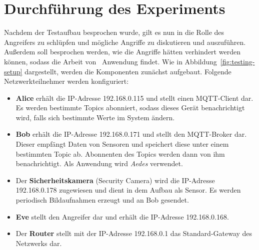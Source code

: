 \section{Durchführung des Experiments}
Nachdem der Testaufbau besprochen wurde, gilt es nun in die Rolle des Angreifers
zu schlüpfen und mögliche Angriffe zu diskutieren und auszuführen. Außerdem soll
besprochen werden, wie die Angriffe hätten verhindert werden können, sodass die
Arbeit von~\cite{paper} Anwendung findet. Wie in
Abbildung~\ref{fig:testing-setup} dargestellt, werden die Komponenten zunächst
aufgebaut. Folgende Netzwerkteilnehmer werden konfiguriert:

\begin{itemize}
  \item \textbf{Alice} erhält die IP-Adresse 192.168.0.115 und stellt einen
    MQTT-Client dar. Es werden bestimmte Topics abonniert, sodass dieses Gerät
    benachrichtigt wird, falls sich bestimmte Werte im System ändern.
  \item \textbf{Bob} erhält die IP-Adresse 192.168.0.171 und stellt den
    MQTT-Broker dar. Dieser empfängt Daten von Sensoren und speichert diese
    unter einem bestimmten Topic ab. Abonnenten des Topics werden dann von ihm
    benachrichtigt. Als Anwendung wird \textit{Aedes} verwendet.
  \item Der \textbf{Sicherheitskamera} (Security Camera) wird die IP-Adresse
    192.168.0.178 zugewiesen und dient in dem Aufbau als Sensor. Es werden
    periodisch Bildaufnahmen erzeugt und an Bob gesendet.
  \item \textbf{Eve} stellt den Angreifer dar und erhält die IP-Adresse
    192.168.0.168.
  \item Der \textbf{Router} stellt mit der IP-Adresse 192.168.0.1 das
    Standard-Gateway des Netzwerks dar.
\end{itemize}

